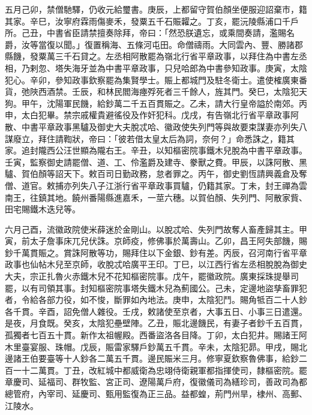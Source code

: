 \begin{pinyinscope}
 五月己卯，禁僧馳驛，仍收元給璽書。庚辰，上都留守賀伯顏坐便服迎詔棄市，籍其家。辛巳，汝寧府霖雨傷麥禾，發粟五千石賑糶之。丁亥，罷沅陵縣浦口千戶所。己丑，中書省臣請禁擅奏除拜，帝曰：「然恐朕遺忘，或乘間奏請，濫賜名爵，汝等當復以聞。」復置稱海、五條河屯田。命僧禱雨。大同雲內、豐、勝諸郡縣饑，發粟萬三千石貸之。左丞相阿散罷為嶺北行省平章政事，以拜住為中書左丞相，乃剌忽、塔失海牙並為中書平章政事，只兒哈郎為中書參知政事。庚寅，太陰犯心。辛卯，參知政事欽察罷為集賢學士。賑上都城門及駐冬衛士。遣使榷廣東番貨，弛陜西酒禁。壬辰，和林民閻海瘞殍死者三千餘人，旌其門。癸巳，太陰犯天狗。甲午，沈陽軍民饑，給鈔萬二千五百貫賑之。乙未，請大行皇帝謚於南郊。丙申，太白犯畢。禁宗戚權貴避徭役及作奸犯科。戊戌，有告嶺北行省平章政事阿散、中書平章政事黑驢及御史大夫脫忒哈、徽政使失列門等與故要束謀妻亦列失八謀廢立，拜住請鞫狀，帝曰：「彼若借太皇太后為詞，奈何？」命悉誅之，籍其家。追封隴西公汪世顯為隴右王。辛丑，以知樞密院事鐵木兒脫為中書平章政事。壬寅，監察御史請罷僧、道、工、伶濫爵及建寺、豢獸之費。甲辰，以誅阿散、黑驢、賀伯顏等詔天下。敕百司日勤政務，怠者罪之。丙午，御史劉恆請興義倉及奪僧、道官。敕捕亦列失八子江浙行省平章政事買驢，仍籍其家。丁未，封王禪為雲南王，往鎮其地。饒州番陽縣進嘉禾，一莖六穗。以賀伯顏、失列門、阿散家貲、田宅賜鐵木迭兒等。



 六月己酉，流徽政院使米薛迷於金剛山。以脫忒哈、失列門故奪人畜產歸其主。甲寅，前太子詹事床兀兒伏誅。京師疫，修佛事於萬壽山。乙卯，昌王阿失部饑，賜鈔千萬貫賑之。賞誅阿散等功，賜拜住以下金銀、鈔有差。丙辰，召河南行省平章政事也仙帖木兒至京師，收脫忒哈廣平王印。丁巳，以江西行省左丞相脫脫為御史大夫，宗正扎魯火赤鐵木兒不花知樞密院事。戊午，罷徽政院。廣東採珠提舉司罷，以有司領其事。封知樞密院事塔失鐵木兒為薊國公。己未，定邊地盜孳畜罪犯者，令給各部力役，如不悛，斷罪如內地法。庚申，太陰犯鬥。賜角牴百二十人鈔各千貫。辛酉，詔免僧人雜役。壬戌，敕諸使至京者，大事五日、小事三日遣還。是夜，月食既。癸亥，太陰犯壘壁陣。乙丑，賑北邊饑民，有妻子者鈔千五百貫，孤獨者七百五十貫。新作太祖幄殿。西番盜洛各目降。丁卯，太白犯井。賜諸王阿木里臺宴服、珠帽。戊辰，賑雷家驛戶鈔萬五千貫。辛未，太陰犯昴。甲戌，賜北邊諸王伯要臺等十人鈔各二萬五千貫。邊民賑米三月。修寧夏欽察魯佛事，給鈔二百一十二萬貫。丁丑，改紅城中都威衛為忠翊侍衛親軍都指揮使司，隸樞密院。罷章慶司、延福司、群牧監、宮正司、遼陽萬戶府，復徽儀司為繕珍司，善政司為都總管府，內宰司、延慶司、甄用監復為正三品。益都蝗，荊門州旱，棣州、高郵、江陵水。




\end{pinyinscope}
